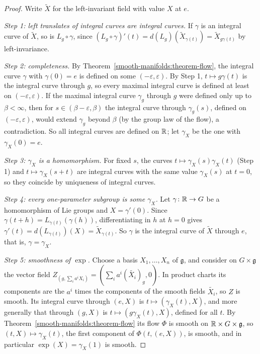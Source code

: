 \begin{proof}
Write $\widetilde{X}$ for the left-invariant field with value $X$ at $e$.

\emph{Step 1: left translates of integral curves are integral curves.} If $\gamma$ is an integral curve of $\widetilde{X}$, so is $L_g \circ \gamma$, since
$(L_g \circ \gamma)'(t) = d(L_g)(\widetilde{X}_{\gamma(t)}) = \widetilde{X}_{g\gamma(t)}$ by left-invariance.

\emph{Step 2: completeness.} By Theorem~\ref{smooth-manifolds:theorem-flow}, the integral curve $\gamma$ with $\gamma(0) = e$ is defined on some
$(-\varepsilon, \varepsilon)$. By Step 1, $t \mapsto g\gamma(t)$ is the integral curve through $g$, so every maximal integral curve is defined at least on
$(-\varepsilon, \varepsilon)$. If the maximal integral curve $\gamma_g$ through $g$ were defined only up to $\beta < \infty$, then for $s \in (\beta - \varepsilon,
\beta)$ the integral curve through $\gamma_g(s)$, defined on $(-\varepsilon, \varepsilon)$, would extend $\gamma_g$ beyond $\beta$ (by the group law of the flow),
a contradiction. So all integral curves are defined on $\mathbb{R}$; let $\gamma_X$ be the one with $\gamma_X(0) = e$.

\emph{Step 3: $\gamma_X$ is a homomorphism.} For fixed $s$, the curves $t \mapsto \gamma_X(s)\gamma_X(t)$ (Step 1) and $t \mapsto \gamma_X(s + t)$ are integral
curves with the same value $\gamma_X(s)$ at $t = 0$, so they coincide by uniqueness of integral curves.

\emph{Step 4: every one-parameter subgroup is some $\gamma_X$.} Let $\gamma \colon \mathbb{R} \to G$ be a homomorphism of Lie groups and $X = \gamma'(0)$. Since
$\gamma(t + h) = L_{\gamma(t)}(\gamma(h))$, differentiating in $h$ at $h = 0$ gives $\gamma'(t) = d(L_{\gamma(t)})(X) = \widetilde{X}_{\gamma(t)}$. So $\gamma$ is
the integral curve of $\widetilde{X}$ through $e$, that is, $\gamma = \gamma_X$.

\emph{Step 5: smoothness of $\exp$.} Choose a basis $X_1, \ldots, X_n$ of $\mathfrak{g}$, and consider on $G \times \mathfrak{g}$ the vector field
$Z_{(g, \sum_ia^iX_i)} = (\sum_ia^i(\widetilde{X_i})_g, 0)$. In product charts its components are the $a^i$ times the components of the smooth fields
$\widetilde{X_i}$, so $Z$ is smooth. Its integral curve through $(e, X)$ is $t \mapsto (\gamma_X(t), X)$, and more generally that through $(g, X)$ is
$t \mapsto (g\gamma_X(t), X)$, defined for all $t$. By Theorem~\ref{smooth-manifolds:theorem-flow} its flow $\Phi$ is smooth on $\mathbb{R} \times G \times \mathfrak{g}$,
so $(t, X) \mapsto \gamma_X(t)$, the first component of $\Phi(t, (e, X))$, is smooth, and in particular $\exp(X) = \gamma_X(1)$ is smooth.


\end{proof}

